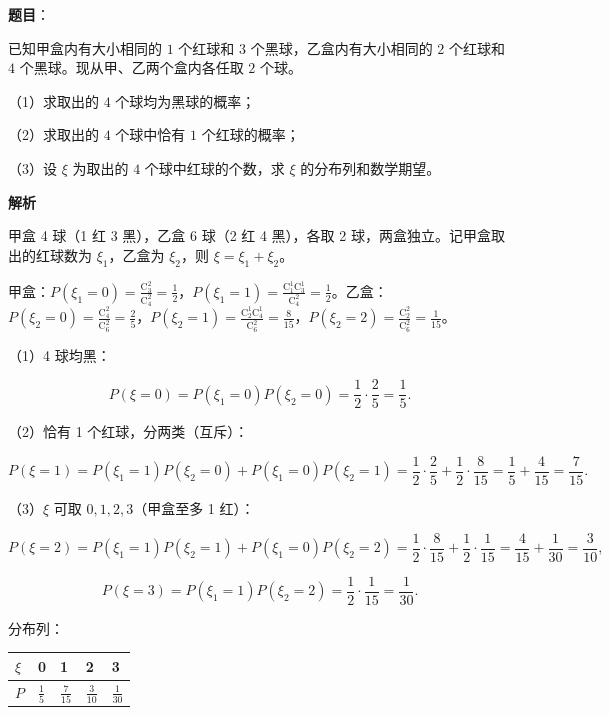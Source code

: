 \begin{answer}

\textbf{题目}：

已知甲盒内有大小相同的 $1$ 个红球和 $3$ 个黑球，乙盒内有大小相同的 $2$ 个红球和 $4$ 个黑球。现从甲、乙两个盒内各任取 $2$ 个球。

（1）求取出的 $4$ 个球均为黑球的概率；

（2）求取出的 $4$ 个球中恰有 $1$ 个红球的概率；

（3）设 $\xi$ 为取出的 $4$ 个球中红球的个数，求 $\xi$ 的分布列和数学期望。

\textbf{解析}

甲盒 4 球（1 红 3 黑），乙盒 6 球（2 红 4 黑），各取 2 球，两盒独立。记甲盒取出的红球数为 $\xi_1$，乙盒为 $\xi_2$，则 $\xi=\xi_1+\xi_2$。

甲盒：$P(\xi_1=0)=\frac{\mathrm C_3^2}{\mathrm C_4^2}=\frac12$，$P(\xi_1=1)=\frac{\mathrm C_1^1\mathrm C_3^1}{\mathrm C_4^2}=\frac12$。乙盒：$P(\xi_2=0)=\frac{\mathrm C_4^2}{\mathrm C_6^2}=\frac25$，$P(\xi_2=1)=\frac{\mathrm C_2^1\mathrm C_4^1}{\mathrm C_6^2}=\frac8{15}$，$P(\xi_2=2)=\frac{\mathrm C_2^2}{\mathrm C_6^2}=\frac1{15}$。

（1）4 球均黑：

\nopagebreak[4]
\[P(\xi=0)=P(\xi_1=0)P(\xi_2=0)=\frac12\cdot\frac25=\frac15 .\]

（2）恰有 1 个红球，分两类（互斥）：

\nopagebreak[4]
\[P(\xi=1)=P(\xi_1=1)P(\xi_2=0)+P(\xi_1=0)P(\xi_2=1)=\frac12\cdot\frac25+\frac12\cdot\frac8{15}=\frac15+\frac4{15}=\frac7{15}.\]

（3）$\xi$ 可取 $0,1,2,3$（甲盒至多 1 红）：

\nopagebreak[4]
\[P(\xi=2)=P(\xi_1=1)P(\xi_2=1)+P(\xi_1=0)P(\xi_2=2)=\frac12\cdot\frac8{15}+\frac12\cdot\frac1{15}=\frac4{15}+\frac1{30}=\frac3{10},\]

\nopagebreak[4]
\[P(\xi=3)=P(\xi_1=1)P(\xi_2=2)=\frac12\cdot\frac1{15}=\frac1{30}.\]

分布列：

\begin{center}
\begin{tabular}{lllll}
\toprule
$\xi$ & 0 & 1 & 2 & 3 \\
\midrule
$P$ & $\frac15$ & $\frac7{15}$ & $\frac3{10}$ & $\frac1{30}$ \\
\bottomrule
\end{tabular}
\end{center}


\end{answer}
